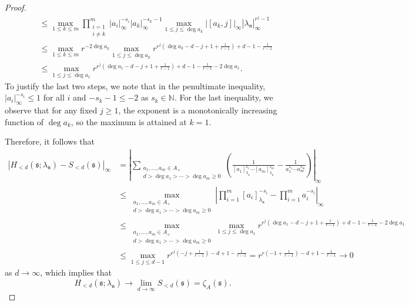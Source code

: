 \documentclass[12pt,reqno]{amsart}
\numberwithin{equation}{section}
\theoremstyle{plain}
\theoremstyle{definition}
\theoremstyle{remark}
\newcommand{\nfk}{\mathfrak{n}}
\newcommand{\ww}[1]{\mathfrak{#1}}
\begin{document}
\begin{proof}
\begin{align*}
        &\leq \max_{1\leq k\leq m}\prod_{\substack{i=1\\ i\neq k}}^m\left|a_i\right|_\infty^{-s_i}|a_k|_\infty^{-s_k-1}\max_{1\leq j\leq \deg a_k}\left|[a_k,j]\right|_\infty\left|\lambda_{\nfk}\right|^{r^j-1}_\infty\\
        &\leq \max_{1\leq k\leq m} r^{-2\deg a_k}\max_{1\leq j\leq \deg a_k}r^{r^j(\deg a_k-d-j+1+\frac{1}{r-1})+d-1-\frac{1}{r-1}}\\
        &\leq \max_{1\leq j\leq \deg a_1}r^{r^j(\deg a_1-d-j+1+\frac{1}{r-1})+d-1-\frac{1}{r-1}-2\deg a_1}.
    \end{align*}
    To justify the last two steps, we note that in the penultimate inequality, $|a_i|_\infty^{-s_i} \le 1$ for all $i$ and $-s_k-1 \le -2$ as $s_k \in \mathbb{N}$. For the last inequality, we observe that for any fixed $j \ge 1$, the exponent is a monotonically increasing function of $\deg a_k$, so the maximum is attained at $k=1$.
    
    Therefore, it follows that
    \begin{align*}
        \left|H_{<d}(\ww{s};\lambda_\nfk)-S_{<d}(\ww{s})\right|_\infty&=\left|\sum_{\substack{a_1,\ldots,a_m\in A_+\\ d>\deg a_1>\cdots>\deg a_m\geq 0}}\left(\frac{1}{[a_1]_{\lambda_\nfk}^{s_1}\cdots[a_m]_{\lambda_\nfk}^{s_m}}-\frac{1}{a_1^{s_1}\cdots a_m^{s_m}}\right)\right|_\infty\\
        &\leq \max_{\substack{a_1,\ldots,a_m\in A_+\\d>\deg a_1>\cdots>\deg a_m\geq 0}}\left|\prod_{i=1}^m[a_i]_{\lambda_\nfk}^{-s_i}-\prod_{i=1}^m a_i^{-s_i}\right|_\infty\\
        &\leq \max_{\substack{a_1,\ldots,a_m\in A_+\\d>\deg a_1>\cdots>\deg a_m\geq 0}}\max_{1\leq j\leq \deg a_1}r^{r^j(\deg a_1-d-j+1+\frac{1}{r-1})+d-1-\frac{1}{r-1}-2\deg a_1}\\
        &\leq \max_{1\leq j\leq d-1}r^{r^j(-j+\frac{1}{r-1})-d+1-\frac{1}{r-1}}=r^{r(-1+\frac{1}{r-1})-d+1-\frac{1}{r-1}}\to 0 
    \end{align*}
    as $d\to\infty$, which implies that
    $$H_{<d}(\ww{s};\lambda_\nfk)\to \lim_{d\to\infty}S_{<d}(\ww{s})=\zeta_A(\ww{s}).$$


\end{proof}
\end{document}
